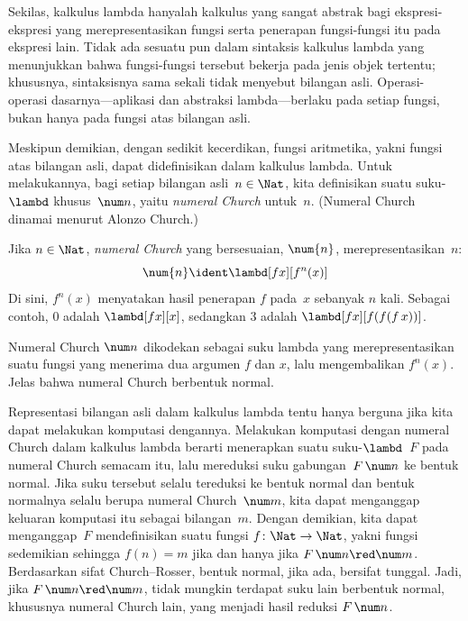 \documentclass[../../../include/open-logic-section]{subfiles}
\begin{document}

Sekilas, kalkulus lambda hanyalah kalkulus yang sangat abstrak bagi
ekspresi-ekspresi yang merepresentasikan fungsi serta penerapan fungsi-fungsi
itu pada ekspresi lain. Tidak ada sesuatu pun dalam sintaksis kalkulus lambda
yang menunjukkan bahwa fungsi-fungsi tersebut bekerja pada jenis objek
tertentu; khususnya, sintaksisnya sama sekali tidak menyebut bilangan asli.
Operasi-operasi dasarnya---aplikasi dan abstraksi lambda---berlaku pada setiap
fungsi, bukan hanya pada fungsi atas bilangan asli.

Meskipun demikian, dengan sedikit kecerdikan, fungsi aritmetika, yakni fungsi
atas bilangan asli, dapat didefinisikan dalam kalkulus lambda. Untuk
melakukannya, bagi setiap bilangan asli~$n \in \Nat$, kita definisikan suatu
suku-$\lambd$ khusus~$\num n$, yaitu \emph{numeral Church} untuk~$n$.
(Numeral Church dinamai menurut Alonzo Church.)

\begin{defn}
  Jika $n \in \Nat$, \emph{numeral Church} yang bersesuaian, $\num{n}$,
  merepresentasikan~$n$:
  \[
    \num{n} \ident \lambd[fx][f^n(x)]
  \]
  Di sini, $f^n(x)$ menyatakan hasil penerapan $f$ pada~$x$ sebanyak $n$
  kali. Sebagai contoh, $\num{0}$ adalah $\lambd[fx][x]$, sedangkan $\num{3}$
  adalah $\lambd[fx][f(f(f\,x))]$.
\end{defn}
  
Numeral Church $\num n$ dikodekan sebagai suku lambda yang merepresentasikan
suatu fungsi yang menerima dua argumen $f$ dan $x$, lalu mengembalikan
$f^n(x)$. Jelas bahwa numeral Church berbentuk normal.

Representasi bilangan asli dalam kalkulus lambda tentu hanya berguna jika kita
dapat melakukan komputasi dengannya. Melakukan komputasi dengan numeral Church
dalam kalkulus lambda berarti menerapkan suatu suku-$\lambd$~$F$ pada numeral
Church semacam itu, lalu mereduksi suku gabungan~$F\, \num n$ ke bentuk normal.
Jika suku tersebut selalu tereduksi ke bentuk normal dan bentuk normalnya selalu
berupa numeral Church~$\num m$, kita dapat menganggap keluaran komputasi itu
sebagai bilangan~$m$. Dengan demikian, kita dapat menganggap~$F$ mendefinisikan
suatu fungsi $f\colon \Nat \to \Nat$, yakni fungsi sedemikian sehingga
$f(n) = m$ jika dan hanya jika $F\, \num n \red \num m$. Berdasarkan sifat
Church--Rosser, bentuk normal, jika ada, bersifat tunggal. Jadi, jika
$F\, \num n \red \num m$, tidak mungkin terdapat suku lain berbentuk normal,
khususnya numeral Church lain, yang menjadi hasil reduksi $F \, \num n$.
\end{document}
